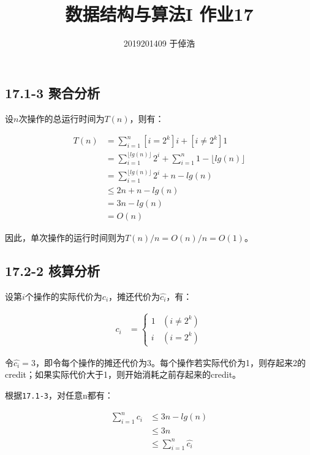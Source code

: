 \documentclass{article}
\title{数据结构与算法I 作业17}
\author{2019201409 于倬浩}
\begin{document}
\maketitle

\hypertarget{header-n33}{%
\subsection{17.1-3 聚合分析}\label{header-n33}}

设\(n\)次操作的总运行时间为\(T(n)\)，则有：

\[\begin{aligned}
	T(n) & = \sum_{i=1}^{n} [i = 2^k] i + [i \neq 2^k] 1 \\
	& = \sum_{i=1}^{\lfloor lg(n) \rfloor} 2^i + \sum_{i=1}^{n}1 - \lfloor lg(n) \rfloor \\
	& = \sum_{i=1}^{\lfloor lg(n) \rfloor} 2^i + n - lg(n) \\
	& \leq 2n + n - lg(n) \\
	& = 3n - lg(n) \\
	& = O(n)
\end{aligned}\]

因此，单次操作的运行时间则为\(T(n)/n = O(n) / n = O(1)\)。

\hypertarget{header-n7}{%
\subsection{17.2-2 核算分析}\label{header-n7}}

设第\(i\)个操作的实际代价为\(c_i\)，摊还代价为\(\hat{c_i}\)，有：

\[\begin{aligned}
	c_i & = \begin{cases}
				1 & (i \neq 2^k) \\
				i & (i = 2^k)
			\end{cases}
\end{aligned}\]

令\(\hat{c_i} = 3\)，即令每个操作的摊还代价为3。每个操作若实际代价为1，则存起来2的credit；如果实际代价大于1，则开始消耗之前存起来的credit。

根据\texttt{17.1-3}，对任意n都有：

\[\begin{aligned}
	\sum_{i=1}^{n}c_i & \leq 3n-lg(n) \\
	& \leq 3n \\
	& \leq \sum_{i=1}^{n} \hat{c_i}
\end{aligned}\]
\end{document}

